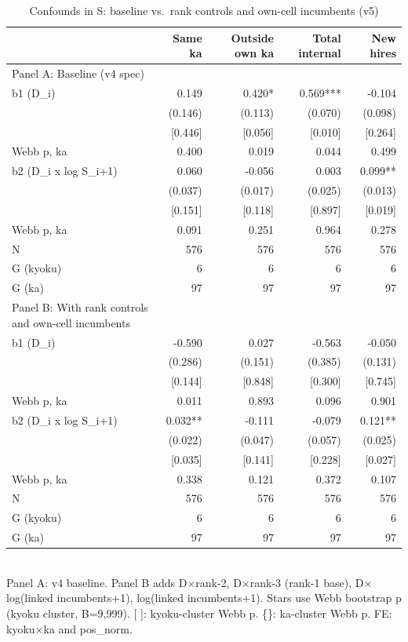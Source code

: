 \begin{table}[!htbp]
  \centering
  \caption{Confounds in S: baseline vs.~rank controls and own-cell incumbents (v5)}
  \label{tab:v5_confounds}
  \begin{tabular}{lrrrr}
    \hline\hline
     & Same ka & Outside own ka & Total internal & New hires \\
    \hline
    Panel A: Baseline (v4 spec) &  &  &  &  \\
    b1 (D_i) & 0.149 & 0.420* & 0.569*** & -0.104 \\
     & (0.146) & (0.113) & (0.070) & (0.098) \\
    [Webb p, kyoku] & [0.446] & [0.056] & [0.010] & [0.264] \\
    {Webb p, ka} & {0.400} & {0.019} & {0.044} & {0.499} \\
    b2 (D_i x log S_i+1) & 0.060 & -0.056 & 0.003 & 0.099** \\
     & (0.037) & (0.017) & (0.025) & (0.013) \\
    [Webb p, kyoku] & [0.151] & [0.118] & [0.897] & [0.019] \\
    {Webb p, ka} & {0.091} & {0.251} & {0.964} & {0.278} \\
    \hline
    N & 576 & 576 & 576 & 576 \\
    G (kyoku) & 6 & 6 & 6 & 6 \\
    G (ka) & 97 & 97 & 97 & 97 \\
    \hline
    Panel B: With rank controls and own-cell incumbents &  &  &  &  \\
    b1 (D_i) & -0.590 & 0.027 & -0.563 & -0.050 \\
     & (0.286) & (0.151) & (0.385) & (0.131) \\
    [Webb p, kyoku] & [0.144] & [0.848] & [0.300] & [0.745] \\
    {Webb p, ka} & {0.011} & {0.893} & {0.096} & {0.901} \\
    b2 (D_i x log S_i+1) & 0.032** & -0.111 & -0.079 & 0.121** \\
     & (0.022) & (0.047) & (0.057) & (0.025) \\
    [Webb p, kyoku] & [0.035] & [0.141] & [0.228] & [0.027] \\
    {Webb p, ka} & {0.338} & {0.121} & {0.372} & {0.107} \\
    \hline
    N & 576 & 576 & 576 & 576 \\
    G (kyoku) & 6 & 6 & 6 & 6 \\
    G (ka) & 97 & 97 & 97 & 97 \\
    \hline\hline
  \end{tabular}
  \\[4pt]
  \footnotesize Panel A: v4 baseline. Panel B adds D$\times$rank-2, D$\times$rank-3 (rank-1 base), D$\times$log(linked incumbents+1), log(linked incumbents+1). Stars use Webb bootstrap p (kyoku cluster, B=9,999). [ ]: kyoku-cluster Webb p. \{\}: ka-cluster Webb p. FE: kyoku$\times$ka and pos\_norm.
\end{table}
